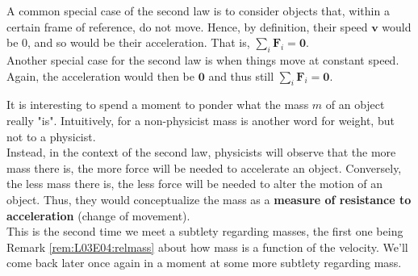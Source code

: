 \documentclass[solutions.tex]{subfiles}
\renewcommand{\bm}[1]{\pmb{#1}}
\begin{document}
\begin{remark} A common special case of the second law is to consider
objects that, within a certain frame of reference, do not move. Hence,
by definition, their speed $\bm{v}$ would be $0$, and so would be their
acceleration. That is, $\sum_i\bm{F}_i = \bm{0}$. \\

Another special case for the second law is when things
move at constant speed. Again, the acceleration would then be $\bm{0}$
and thus still $\sum_i\bm{F}_i = \bm{0}$.
\end{remark}

\begin{remark}\label{rem:L03E04:mass} It is interesting to spend a moment to ponder
what the mass $m$ of an object really "is". Intuitively, for a non-physicist
mass is another word for weight, but not to a physicist. \\

Instead, in the context of the second law, physicists will observe
that the more mass there is, the more force will be needed to accelerate
an object. Conversely, the less mass there is, the less force will be needed to
alter the motion of an object. Thus, they would conceptualize the mass
as a \textbf{measure of resistance to acceleration} (change of movement). \\

This is the second time we meet a subtlety regarding masses, the
first one being Remark \ref{rem:L03E04:relmass} about how mass
is a function of the velocity. We'll come back later once again in a
moment at some more subtlety regarding mass.
\end{remark}
\end{document}
